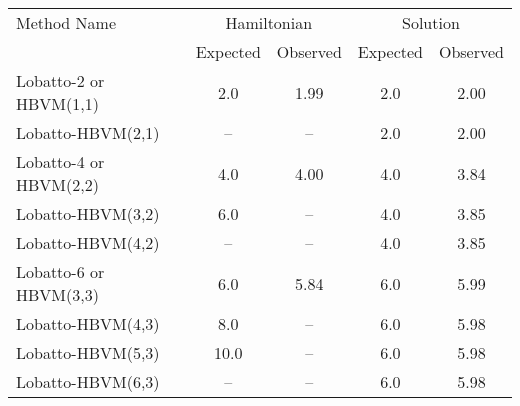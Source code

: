 \begin{tabular}{l|cccc}
\toprule
           Method Name & \multicolumn{2}{c}{Hamiltonian} & \multicolumn{2}{c}{Solution} \\
                       &    Expected & Observed & Expected & Observed \\
\midrule
Lobatto-2 or HBVM(1,1) &         2.0 &     1.99 &      2.0 &     2.00 \\
     Lobatto-HBVM(2,1) &          -- &       -- &      2.0 &     2.00 \\
Lobatto-4 or HBVM(2,2) &         4.0 &     4.00 &      4.0 &     3.84 \\
     Lobatto-HBVM(3,2) &         6.0 &       -- &      4.0 &     3.85 \\
     Lobatto-HBVM(4,2) &          -- &       -- &      4.0 &     3.85 \\
Lobatto-6 or HBVM(3,3) &         6.0 &     5.84 &      6.0 &     5.99 \\
     Lobatto-HBVM(4,3) &         8.0 &       -- &      6.0 &     5.98 \\
     Lobatto-HBVM(5,3) &        10.0 &       -- &      6.0 &     5.98 \\
     Lobatto-HBVM(6,3) &          -- &       -- &      6.0 &     5.98 \\
\bottomrule
\end{tabular}
